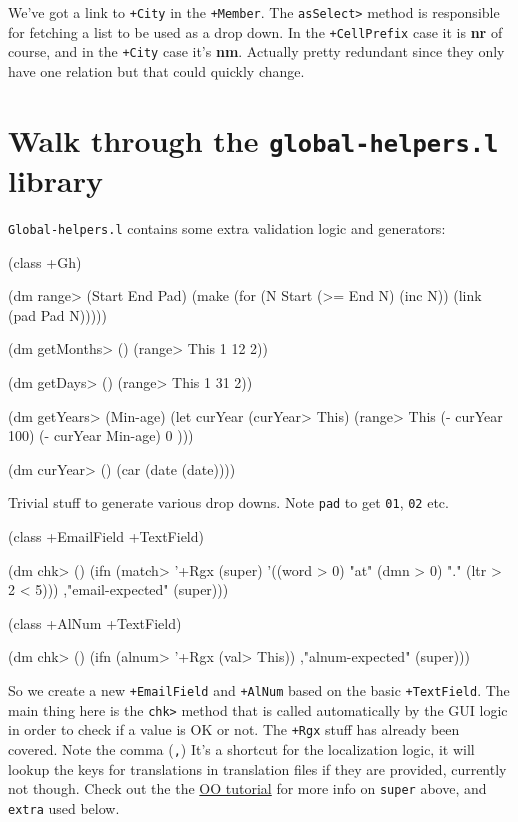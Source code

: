 We've got a link to \texttt{+City} in the \texttt{+Member}. The
\texttt{asSelect>} method is responsible for fetching a list to be
used as a drop down. In the \texttt{+CellPrefix} case it is
\textbf{nr} of course, and in the \texttt{+City} case it's
\textbf{nm}. Actually pretty redundant since they only have one
relation but that could quickly change.


\section{Walk through the \texttt{global-helpers.l} library}
\label{sec:registration-form}

\texttt{Global-helpers.l} contains some extra validation logic and
generators:

\begin{wideverbatim}
(class +Gh)

(dm range> (Start End Pad) 
    (make 
     (for (N Start (>= End N) (inc N)) (link (pad Pad N)))))
    
(dm getMonths> () 
    (range> This 1 12 2))

(dm getDays> () 
    (range> This 1 31 2))

(dm getYears> (Min-age)
    (let curYear (curYear> This) 
      (range> This (- curYear 100) (- curYear Min-age) 0 )))

(dm curYear> () (car (date (date))))
\end{wideverbatim}

Trivial stuff to generate various drop downs. Note \texttt{pad} to
get \texttt{01}, \texttt{02} etc.


\begin{wideverbatim}
(class +EmailField +TextField)
    
(dm chk> ()
  (ifn 
     (match> '+Rgx (super) '((word > 0) "{at}" (dmn > 0) "." (ltr > 2 < 5))) 
     ,"email-expected" 
     (super)))
    
(class +AlNum +TextField)

(dm chk> ()
  (ifn (alnum> '+Rgx (val> This)) ,"alnum-expected" (super)))
\end{wideverbatim}

So we create a new \texttt{+EmailField} and \texttt{+AlNum} based
on the basic \texttt{+TextField}. The main thing here is the
\texttt{chk>} method that is called automatically by the GUI logic
in order to check if a value is OK or not. The \texttt{+Rgx} stuff has
already been covered. Note the comma (\texttt{,}) It's a shortcut
for the localization logic, it will lookup the keys for translations
in translation files if they are provided, currently not though. Check
out the the
\href{http://www.prodevtips.com/2008/04/11/more-oo-in-pico-lisp/}{OO
  tutorial} for more info on \texttt{super} above, and
\texttt{extra} used below.



